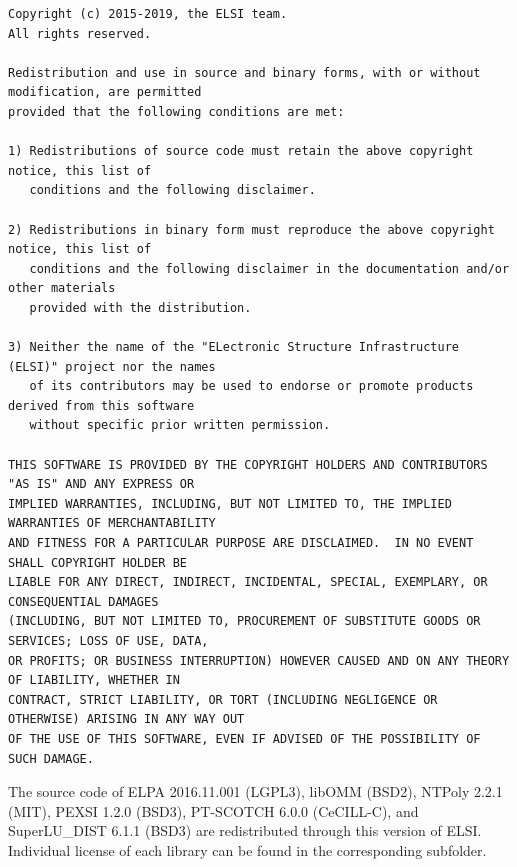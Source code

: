 \documentclass{report}
\begin{document}
\begin{tcolorbox}
\begin{Verbatim}
Copyright (c) 2015-2019, the ELSI team.
All rights reserved.

Redistribution and use in source and binary forms, with or without modification, are permitted
provided that the following conditions are met:

1) Redistributions of source code must retain the above copyright notice, this list of
   conditions and the following disclaimer.

2) Redistributions in binary form must reproduce the above copyright notice, this list of
   conditions and the following disclaimer in the documentation and/or other materials
   provided with the distribution.

3) Neither the name of the "ELectronic Structure Infrastructure (ELSI)" project nor the names
   of its contributors may be used to endorse or promote products derived from this software
   without specific prior written permission.

THIS SOFTWARE IS PROVIDED BY THE COPYRIGHT HOLDERS AND CONTRIBUTORS "AS IS" AND ANY EXPRESS OR
IMPLIED WARRANTIES, INCLUDING, BUT NOT LIMITED TO, THE IMPLIED WARRANTIES OF MERCHANTABILITY
AND FITNESS FOR A PARTICULAR PURPOSE ARE DISCLAIMED.  IN NO EVENT SHALL COPYRIGHT HOLDER BE
LIABLE FOR ANY DIRECT, INDIRECT, INCIDENTAL, SPECIAL, EXEMPLARY, OR CONSEQUENTIAL DAMAGES
(INCLUDING, BUT NOT LIMITED TO, PROCUREMENT OF SUBSTITUTE GOODS OR SERVICES; LOSS OF USE, DATA,
OR PROFITS; OR BUSINESS INTERRUPTION) HOWEVER CAUSED AND ON ANY THEORY OF LIABILITY, WHETHER IN
CONTRACT, STRICT LIABILITY, OR TORT (INCLUDING NEGLIGENCE OR OTHERWISE) ARISING IN ANY WAY OUT
OF THE USE OF THIS SOFTWARE, EVEN IF ADVISED OF THE POSSIBILITY OF SUCH DAMAGE.
\end{Verbatim}
\end{tcolorbox}

The source code of ELPA 2016.11.001 (LGPL3), libOMM (BSD2), NTPoly 2.2.1 (MIT), PEXSI 1.2.0 (BSD3), PT-SCOTCH 6.0.0 (CeCILL-C), and SuperLU\_DIST 6.1.1 (BSD3) are redistributed through this version of ELSI.  Individual license of each library can be found in the corresponding subfolder.
\end{document}
